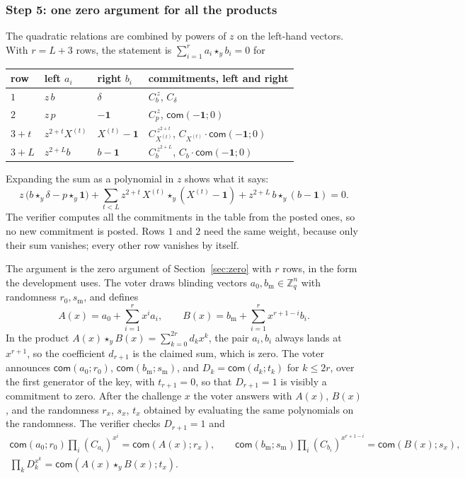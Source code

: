 \documentclass[11pt,a4paper]{article}
\newcommand{\Z}{\mathbb{Z}}
\newcommand{\com}{\mathsf{com}}
\theoremstyle{remark}
\begin{document}
\subsubsection*{Step 5: one zero argument for all the products}
The quadratic relations are combined by powers of $z$ on the left-hand
vectors. With $r = L + 3$ rows, the statement is
$\sum_{i=1}^{r} a_i \star_y b_i = 0$ for
\begin{center}
\begin{tabular}{@{}llll@{}}
\toprule
row & left $a_i$ & right $b_i$ & commitments, left and right \\
\midrule
$1$ & $z\, b$ & $\delta$ & $C_b^{\,z}$, $C_\delta$ \\
$2$ & $z\, p$ & $-\mathbf{1}$ & $C_p^{\,z}$, $\com(-\mathbf{1}; 0)$ \\
$3 + t$ & $z^{2+t} X^{(t)}$ & $X^{(t)} - \mathbf{1}$ & $C_{X^{(t)}}^{\,z^{2+t}}$, $C_{X^{(t)}} \cdot \com(-\mathbf{1}; 0)$ \\
$3 + L$ & $z^{2+L} b$ & $b - \mathbf{1}$ & $C_b^{\,z^{2+L}}$, $C_b \cdot \com(-\mathbf{1}; 0)$ \\
\bottomrule
\end{tabular}
\end{center}
Expanding the sum as a polynomial in $z$ shows what it says:
\[
  z\,\big(b \star_y \delta - p \star_y \mathbf{1}\big)
  + \sum_{t < L} z^{2 + t}\, X^{(t)} \star_y (X^{(t)} - \mathbf{1})
  + z^{2 + L}\, b \star_y (b - \mathbf{1}) = 0 .
\]
The verifier computes all the commitments in the table from the posted
ones, so no new commitment is posted. Rows $1$ and $2$ need the same
weight, because only their sum vanishes; every other row vanishes by
itself.

The argument is the zero argument of Section~\ref{sec:zero} with $r$ rows,
in the form the development uses. The voter draws blinding vectors $a_0,
b_{\mathrm{m}} \in \Z_q^{n}$ with randomness $r_0, s_{\mathrm{m}}$, and
defines
\[
  A(x) = a_0 + \sum_{i=1}^{r} x^{i} a_i, \qquad
  B(x) = b_{\mathrm{m}} + \sum_{i=1}^{r} x^{r + 1 - i} b_i .
\]
In the product $A(x) \star_y B(x) = \sum_{k=0}^{2r} d_k x^{k}$, the pair
$a_i, b_i$ always lands at $x^{r+1}$, so the coefficient $d_{r+1}$ is the
claimed sum, which is zero. The voter announces $\com(a_0; r_0)$,
$\com(b_{\mathrm{m}}; s_{\mathrm{m}})$, and $D_k = \com(d_k; t_k)$ for $k
\le 2r$, over the first generator of the key, with $t_{r+1} = 0$, so that
$D_{r+1} = 1$ is visibly a commitment to zero. After the challenge $x$ the
voter answers with $A(x)$, $B(x)$, and the randomness $r_x$, $s_x$, $t_x$
obtained by evaluating the same polynomials on the randomness. The
verifier checks $D_{r+1} = 1$ and
\begin{gather*}
  \com(a_0; r_0) \prod_{i} (C_{a_i})^{x^{i}} = \com(A(x); r_x), \qquad
  \com(b_{\mathrm{m}}; s_{\mathrm{m}}) \prod_{i} (C_{b_i})^{x^{r+1-i}} = \com(B(x); s_x),\\
  \prod_{k} D_k^{x^{k}} = \com(A(x) \star_y B(x); t_x).
\end{gather*}
\end{document}
